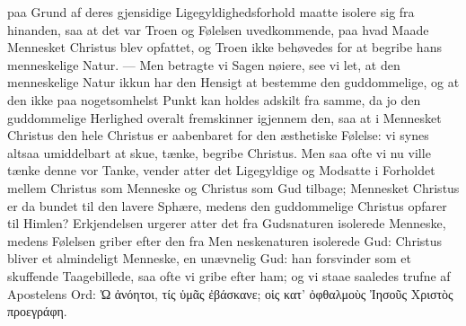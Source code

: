 \documentclass[12pt]{book}
\newcommand{\opage}[1]{\marginnote{\footnotesize\textit{[#1]}}}
\begin{document}
paa Grund af deres gjensidige Ligegyldighedsforhold maatte isolere sig fra
hinanden, saa at det var Troen og Følelsen uvedkommende, paa hvad Maade
Mennesket Christus blev opfattet, og Troen ikke behøvedes for at begribe hans
menneskelige Natur. --- Men betragte vi Sagen nøiere, see vi let, at den
menneskelige Natur ikkun har den Hensigt at bestemme den guddommelige, og at
den ikke paa nogetsomhelst Punkt kan holdes adskilt fra samme, da jo den
guddommelige Herlighed overalt fremskinner igjennem den, saa at i Mennesket
Christus den hele Christus er aabenbaret for den æsthetiske Følelse: vi synes
altsaa umiddelbart at skue, tænke, begribe Christus. Men saa ofte vi nu ville
tænke denne vor Tanke, vender atter det Ligegyldige og Modsatte i Forholdet
mellem Christus som Menneske og Christus som Gud tilbage; Mennesket Christus er
da bundet til den lavere Sphære, medens den guddommelige Christus opfarer til
Himlen? Erkjendelsen urgerer atter det fra Gudsnaturen isolerede Menneske,
medens Følelsen griber efter den fra Men\-%
\opage{125}neskenaturen isolerede Gud: Christus bliver et almindeligt Menneske, en
unævnelig Gud: han forsvinder som et skuffende Taagebillede, saa ofte vi gribe
efter ham; og vi staae saaledes trufne af Apostelens Ord: Ὠ ἀνόητοι, τίς ὑμᾶς
ἐβάσκανε; οἱς κατ' ὀφθαλμοὺς Ἰησοῦς Χριστὸς προεγράφη.
\end{document}
